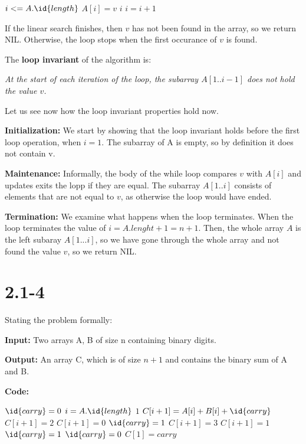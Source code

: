\documentclass{article}
\begin{document}
\begin{codebox}
  \li \While $i <= A.\id{length}$
  \li \Do
  \zi   \If $A[i] = v$
  \li   \Then
  \zi     \Return $i$
        \End
  \li     $i = i + 1$
      \End
  \li \Return {}
\end{codebox}

If the linear search finishes, then $v$ has not been found in the array, so we return NIL. Otherwise, the loop stops when the first occurance of $v$ is found.

The \textbf{loop invariant} of the algorithm is: 

\begin{center} \textit{
  At the start of each iteration of the loop, the subarray $A[1..i-1]$ does not hold the value $v$. }
\end{center}

Let us see now how the loop invariant properties hold now.

\textbf{Initialization:} We start by showing that the loop invariant holds before the first loop operation, when $i = 1$. The subarray of A is empty, so by definition it does not contain v. 

\textbf{Maintenance:} Informally, the body of the while loop compares $v$ with $A[i]$ and updates exits the lopp if they are equal. The subarray $A[1..i]$ consists of elements that are not equal to $v$, as otherwise the loop would have ended.

\textbf{Termination:} We examine what happens when the loop terminates. When the loop terminates the value of $i = A.lenght + 1 = n + 1$. Then, the whole array $A$ is the left subaray $A[1...i]$, so we have gone through the whole array and not found the value $v$, so we return NIL.

\section*{2.1-4}

Stating the problem formally:

\textbf{Input:} Two arrays A, B of size n containing binary digits.

\textbf{Output:} An array C, which is of size $n+1$ and contains the binary sum of A and B.

\textbf{Code:}

\begin{codebox}
  \li $\id{carry} = 0$ 
  \li \For $i = A.\id{length}$ \Downto $1$
  \li \Do
  \zi   $C[i+1] = A[i] + B[i] + \id{carry}$
  \li   \If $C[i+1] = 2$ 
  \li   \Then
  \zi     $C[i+1] = 0$
  \li     $\id{carry} = 1$
  \li   \ElseIf $C[i+1] = 3$  
  \li   \Then
  \zi     $C[i+1] = 1$
  \li     $\id{carry} = 1$
  \li   \Else
  \li     $\id{carry} = 0$
        \End
      \End
  \li $C[1] = carry$
\end{codebox}
\end{document}
